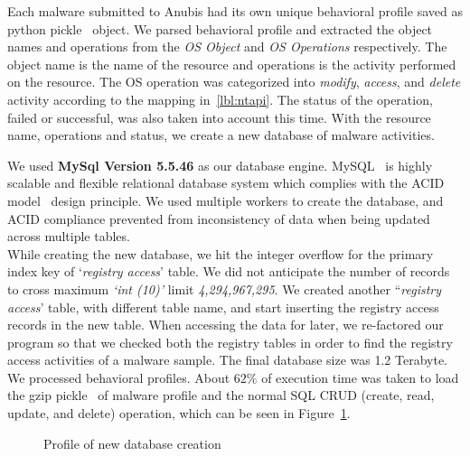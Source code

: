 Each malware submitted to Anubis had its own unique behavioral profile saved as python pickle~\cite{pythonpickle} object.
We parsed behavioral profile and extracted the object names and operations from the \emph{OS Object} and \emph{OS Operations} respectively.
The object name is the name of the resource and operations is the activity performed on the resource.
The OS operation was categorized into \emph{modify}, \emph{access}, and \emph{delete} activity according to the mapping in~\autoref{lbl:ntapi}.
The status of the operation, failed or successful, was also taken into account this time.
With the resource name, operations and status, we create a new database of malware activities.

We used \textbf{MySql Version 5.5.46} as our database engine. MySQL~\cite[]{mysql} is highly scalable and flexible relational database system which complies with the ACID model~\cite[]{acid} design principle.
We used multiple workers to create the database, and ACID compliance prevented from inconsistency of data when being updated across multiple tables.\\

While creating the new database, we hit the integer overflow for the primary index key of `\emph{registry access}' table.
We did not anticipate the number of records to cross maximum \emph{`int (10)'} limit \emph{4,294,967,295}.
We created another ``\emph{registry access}' table, with different table name, and start inserting the registry access records in the new table.
When accessing the data for later, we re-factored our program so that we checked both the registry tables in order to find the registry access activities of a malware sample.
The final database size was 1.2 Terabyte.\\

We processed \gettotalmalwareii{} behavioral profiles.
About $62\%$ of execution time was taken to load the gzip pickle~\cite[]{pythonpickle} of malware profile and the normal SQL CRUD (create, read, update, and delete) operation, which can be seen in Figure~\ref{fig:dbcreation}.
\begin{figure}[ht]
    \centering
    \def\svgwidth{\columnwidth}
    \scalebox{0.99}{}
\caption{Profile of new database creation}
\label{fig:dbcreation}
\end{figure}

